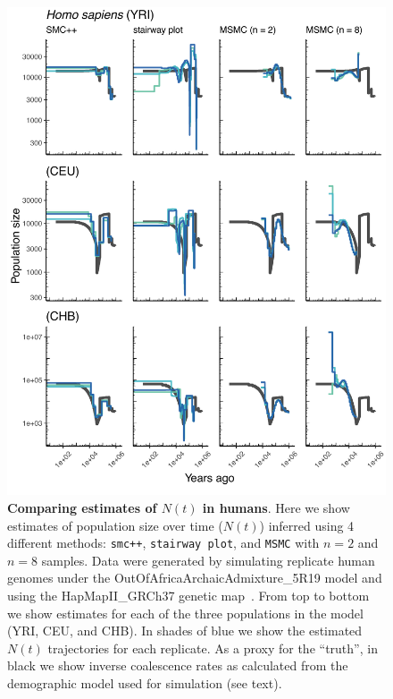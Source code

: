 \documentclass[12pt,halfline,a4paper]{ouparticle}
\newcommand{\MSMC}{\texttt{MSMC}\xspace}
\newcommand{\smcpp}{\texttt{smc++}\xspace}
\begin{document}
\begin{figure}
\begin{center}
\includegraphics[width=0.8\linewidth]{display_items/HomSap_OutOfAfricaArchaicAdmixture_5R19.pdf}
\caption{\textbf{Comparing estimates of $N(t)$ in humans}. Here we show estimates of population
size over time ($N(t)$) inferred using 4 different methods: \smcpp, \texttt{stairway plot}, and
\MSMC with $n=2$ and $n=8$ samples. Data were generated by simulating
replicate human genomes under the OutOfAfricaArchaicAdmixture\_5R19 model \citep{ragsdale2019models} and using the
HapMapII\_GRCh37 genetic map~\citep{international2007second}. From top to bottom we show estimates for each
of the three populations in the model (YRI, CEU, and CHB). In shades of blue we show the estimated
$N(t)$ trajectories for each replicate.
As a proxy for the ``truth'', in black we show inverse coalescence rates
as calculated from the demographic model used for simulation (see text).
}
\label{fig:n_t_ragsdale}
\end{center}
\end{figure}
\end{document}
